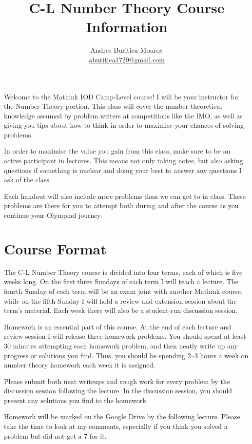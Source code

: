 \documentclass{article}
\title{C-L Number Theory Course Information}
\author{Andres Buritica Monroy \\
\href{mailto:aburitica1729@gmail.com}{aburitica1729@gmail.com}}
\date{}
\begin{document}
\maketitle
Welcome to the Mathink IOD Camp-Level course! I will be your instructor for the
Number Theory portion. This class will cover the number theoretical knowledge
assumed by problem writers at competitions like the IMO, as well as giving you
tips about how to think in order to maximise your chances of solving problems.

In order to maximise the value you gain from this class, make sure to be an
active participant in lectures. This means not only taking notes, but also
asking questions if something is unclear and doing your best to answer any
questions I ask of the class.

Each handout will also include more problems than we can get to in class. These
problems are there for you to attempt both during and after the course as you
continue your Olympiad journey.
\section{Course Format}
The C-L Number Theory course is divided into four terms, each of which is five
weeks long. On the first three Sundays of each term I will teach a lecture. The
fourth Sunday of each term will be an exam joint with another Mathink course,
while on the fifth Sunday I will hold a review and extension session about the
term's material. Each week there will also be a student-run discussion session.

Homework is an essential part of this course. At the end of each lecture and
review session I will release three homework problems. You should spend at
least 30 minutes attempting each homework problem, and then neatly write up any
progress or solutions you find. Thus, you should be spending 2--3 hours a week
on number theory homework each week it is assigned.

Please submit both neat writeups and rough work
for every problem by the discussion session following the lecture. In the
discussion session, you should present any solutions you find to the homework.

Homework will be marked on the Google Drive by the following lecture. Please
take the time to look at my comments, especially if you think you solved a
problem but did not get a 7 for it.
\newpage
\end{document}
